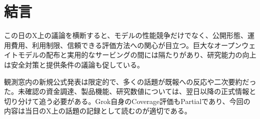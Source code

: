 \section{結言}
この日のX上の議論を横断すると、モデルの性能競争だけでなく、公開形態、運用費用、利用制限、信頼できる評価方法への関心が目立つ。巨大なオープンウェイトモデルの配布と実用的なサービングの間には隔たりがあり、研究能力の向上は安全対策と提供条件の議論も促している。

観測窓内の新規公式発表は限定的で、多くの話題が既報への反応や二次要約だった。未確認の資金調達、製品機能、研究数値については、翌日以降の正式情報と切り分けて追う必要がある。Grok自身のCoverage評価もPartialであり、今回の内容は当日のX上の話題の記録として読むのが適切である。
